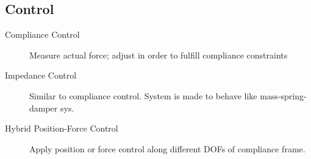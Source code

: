 \subsection{Control}
    \begin{description}
        \item[Compliance Control] Measure actual force; adjust in order to fulfill compliance constraints
        \item[Impedance Control] Similar to compliance control. System is made to behave like mass-spring-damper sys. 
        \item[Hybrid Position-Force Control] Apply position or force control along different DOFs of compliance frame.
    \end{description}